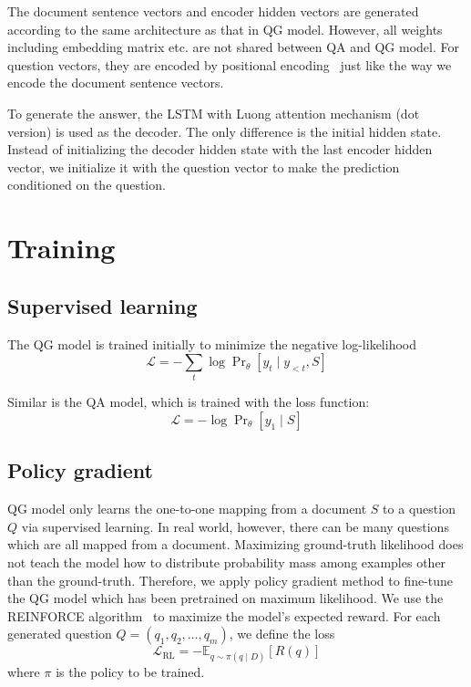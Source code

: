 \documentclass{article}
\begin{document}
The document sentence vectors and encoder hidden vectors are generated according to the same architecture as that in QG model. However, all weights including embedding matrix etc. are not shared between QA and QG model. For question vectors, they are encoded by positional encoding~\cite{sswf15:memn2n} just like the way we encode the document sentence vectors.

To generate the answer, the LSTM with Luong attention mechanism (dot version) is used as the decoder. The only difference is the initial hidden state. Instead of initializing the decoder hidden state with the last encoder hidden vector, we initialize it with the question vector to make the prediction conditioned on the question.

\section{Training}
\label{sec:training}
\subsection{Supervised learning}
The QG model is trained initially to minimize the negative log-likelihood
\begin{equation}
    \mathcal{L}=-\sum_{t}\log \Pr\nolimits_\theta\left[y_t \mid y_{<t}, S\right]
\end{equation}

Similar is the QA model, which is trained with the loss function:
\begin{equation}
    \mathcal{L}=-\log \Pr\nolimits_\theta\left[y_1 \mid S\right]
\end{equation}
\subsection{Policy gradient}
\label{subsec:policy}
QG model only learns the one-to-one mapping from a document $S$ to a question $Q$ via supervised learning. In real world, however, there can be many questions which are all mapped from a document. Maximizing ground-truth likelihood does not teach the model how to distribute probability mass among examples other than the ground-truth. 
Therefore, we apply policy gradient method to fine-tune the QG model which has been pretrained on maximum likelihood. We use the REINFORCE algorithm~\cite{j92:reinforce} to maximize the model's expected reward. For each generated question $Q=(q_1,q_2,\ldots,q_m)$, we define the loss
\begin{equation}
\label{eq:rl_loss}
    \mathcal{L}_{\text{RL}}=-\mathbb{E}_{q\sim \pi(q \mid D)}\left[R(q)\right]
\end{equation}
where $\pi$ is the policy to be trained. 
\end{document}
